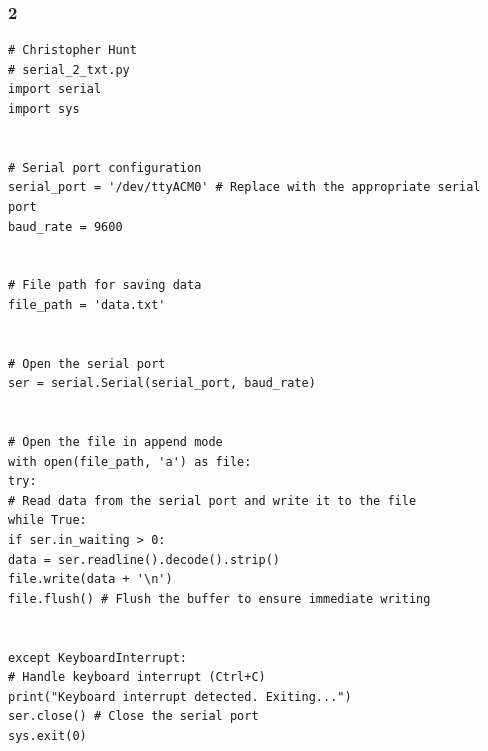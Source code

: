 \documentclass{article}
\begin{document}
\newpage\subsubsection*{2}
\begin{lstlisting}
# Christopher Hunt
# serial_2_txt.py
import serial
import sys


# Serial port configuration
serial_port = '/dev/ttyACM0' # Replace with the appropriate serial port
baud_rate = 9600


# File path for saving data
file_path = 'data.txt'


# Open the serial port
ser = serial.Serial(serial_port, baud_rate)


# Open the file in append mode
with open(file_path, 'a') as file:
try:
# Read data from the serial port and write it to the file
while True:
if ser.in_waiting > 0:
data = ser.readline().decode().strip()
file.write(data + '\n')
file.flush() # Flush the buffer to ensure immediate writing


except KeyboardInterrupt:
# Handle keyboard interrupt (Ctrl+C)
print("Keyboard interrupt detected. Exiting...")
ser.close() # Close the serial port
sys.exit(0)


\end{lstlisting}


\newpage
\end{document}
